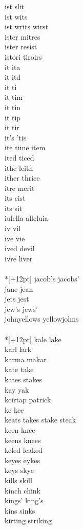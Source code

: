 ist slit \\
ist wits \\
ist writs wirst  \\
ister mitres \\
ister resist \\
istori tiroirs \\
it ita \\
it itd \\
it ti\\
it tim \\
it tin \\
it tip \\
it tir \\
it's 'tis\\
ite time item \\
ited ticed \\
ithe leith \\
ither thrice \\
itre merit \\
its cist \\
its sit\\
iulella alleluia \\
iv vil \\
ive vie\\
ived devil \\
ivre liver \\

\vspace{14pt}
\noindent\notextbf{\LargeJ}\\*[+12pt]
jacob's jacobs'\\
jane jean\\
jets jest\\
jew's jews'\\
johnyellows yellowjohns\\

\vspace{14pt}
\noindent\notextbf{\LargeK}\\*[+12pt]
kale lake\\
karl lark\\
karma makar\\
kate take\\
kates stakes \\
kay yak\\
kcirtap patrick\\
ke kee \\
keats takes stake steak\\
keen knee\\
keens knees\\
keled leaked \\
keyes eykes\\
keys skye\\
kills skill\\
kinch chink\\
kings' king's\\
kins sinks \\
kirting striking \\

